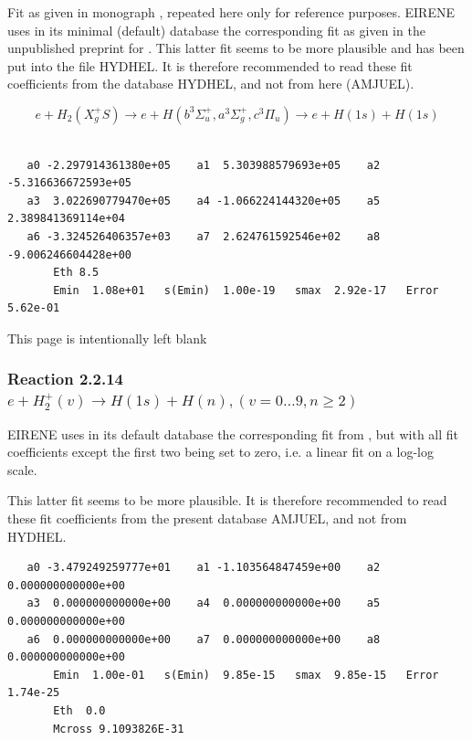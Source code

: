 \documentclass[12pt,dvipdfmx]{article}
\begin{document}
Fit as given in monograph \cite{kn:Janev}, repeated here only for reference purposes.
EIRENE uses in its minimal (default) database the corresponding fit as given in the unpublished preprint for
\cite{kn:Janev}.
This latter fit seems to be more plausible and has been put
into the file HYDHEL.
It is therefore recommended to read these
fit coefficients from the database HYDHEL, and not from here (AMJUEL).





\begin{displaymath}
 e + H_2(X_g^+ S) \rightarrow e + H(b^3\Sigma^+_u , a^3\Sigma^+_g,
c^3\Pi_u)
             \rightarrow e + H(1s) + H(1s)
\end{displaymath}


\begin{small}\begin{verbatim}

   a0 -2.297914361380e+05    a1  5.303988579693e+05    a2 -5.316636672593e+05
   a3  3.022690779470e+05    a4 -1.066224144320e+05    a5  2.389841369114e+04
   a6 -3.324526406357e+03    a7  2.624761592546e+02    a8 -9.006246604428e+00
       Eth 8.5
       Emin  1.08e+01   s(Emin)  1.00e-19   smax  2.92e-17   Error  5.62e-01
\end{verbatim}\end{small}
\newpage
This page is intentionally left blank
\newpage
\subsubsection{
Reaction 2.2.14 $   e + H_2^+(v) \rightarrow H(1s) + H(n), (v=0\ldots 9, n\geq 2)$}


EIRENE uses in its default database the corresponding fit from \cite{kn:Janev},
but  with all fit coefficients except the first two being set to zero,
i.e. a linear fit on a log-log scale.

This latter fit seems to be more plausible.
It is therefore recommended to read these
fit coefficients from the present database AMJUEL, and not from HYDHEL.

\begin{small}\begin{verbatim}
   a0 -3.479249259777e+01    a1 -1.103564847459e+00    a2  0.000000000000e+00
   a3  0.000000000000e+00    a4  0.000000000000e+00    a5  0.000000000000e+00
   a6  0.000000000000e+00    a7  0.000000000000e+00    a8  0.000000000000e+00
       Emin  1.00e-01   s(Emin)  9.85e-15   smax  9.85e-15   Error  1.74e-25
       Eth  0.0
       Mcross 9.1093826E-31
\end{verbatim}\end{small}
\end{document}
